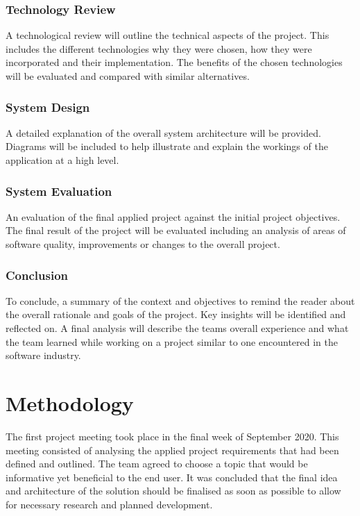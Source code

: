 \subsection{Technology Review}
A technological review will outline the technical aspects of the project. This includes the different technologies why they were chosen, how they were incorporated and their implementation. The benefits of the chosen technologies will be evaluated and compared with similar alternatives.

\subsection{System Design}
A detailed explanation of the overall system architecture will be provided. Diagrams will be included to help illustrate and explain the workings of the application at a high level.

\subsection{System Evaluation}
An evaluation of the final applied project against the initial project objectives. The final result of the project will be evaluated including an analysis of areas of software quality, improvements or changes to the overall project.

\subsection{Conclusion}
To conclude, a summary of the context and objectives to remind the reader about the overall rationale and goals of the project. Key insights will be identified and reflected on. A final analysis will describe the teams overall experience and what the team learned while working on a project similar to one encountered in the software industry.


\chapter{Methodology}
The first project meeting took place in the final week of September 2020. This meeting consisted of analysing the applied project requirements that had been defined and outlined. The team agreed to choose a topic that would be informative yet beneficial to the end user. It was concluded that the final idea and architecture of the solution should be finalised as soon as possible to allow for necessary research and planned development.

